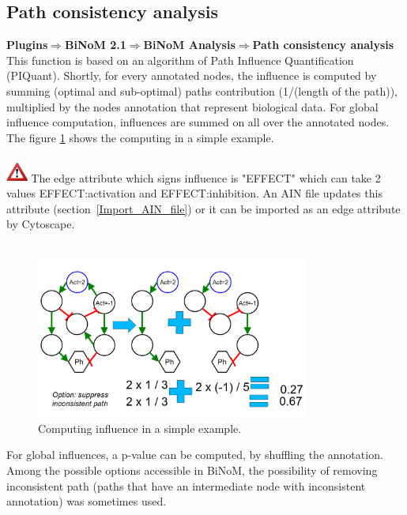\subsection{Path consistency analysis}
\textbf{Plugins$\Rightarrow$BiNoM 2.1$\Rightarrow$BiNoM Analysis$\Rightarrow$Path consistency analysis}\\
This function is based on an algorithm of  Path Influence Quantification (PIQuant). Shortly, for every annotated nodes, the influence is computed by summing (optimal and sub-optimal) paths contribution (1/(length of the path)), multiplied by the nodes annotation that represent biological data. For global influence computation, influences are summed on all over the annotated nodes. The figure \ref{PIQuant_example} shows the computing in a simple example.\\\\
\includegraphics[width=20pt,height=20pt]{graphics/warning} The edge attribute which signs influence is "EFFECT" which can take 2 values EFFECT:activation and EFFECT:inhibition. An AIN file updates this attribute (section~\ref{Import_AIN_file}) or it can be imported as an edge attribute by Cytoscape.\\\\
\begin{figure}
\centering
\includegraphics[width=0.8\textwidth]{graphics/PIQuant_example}
\caption{Computing influence in a simple example.}
\label{PIQuant_example}
\end{figure}
For global influences, a p-value can be computed, by shuffling the annotation. Among the possible options accessible in BiNoM, the possibility of removing inconsistent path (paths that have an intermediate node with inconsistent annotation) was sometimes used.\\\\
